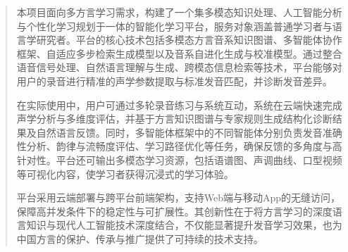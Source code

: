 

\begin{abstract}
本项目面向多方言学习需求，构建了一个集多模态知识处理、人工智能分析与个性化学习规划于一体的智能化学习平台，服务对象涵盖普通学习者与语言学研究者。平台的核心技术包括多模态方言音系知识图谱、多智能体协作框架、自适应多步检索生成模型以及音系自进化生成与校准模型。通过整合语音信号处理、自然语言理解与生成、跨模态信息检索等技术，平台能够对用户的录音进行精准的声学参数提取与标准发音匹配，并诊断发音差异。

在实际使用中，用户可通过多轮录音练习与系统互动，系统在云端快速完成声学分析与多维度评估，并基于方言知识图谱与专家规则生成结构化诊断结果及自然语言反馈。同时，多智能体框架中的不同智能体分别负责发音准确性分析、韵律与流畅度评估、学习路径优化等任务，确保反馈的多角度与高针对性。平台还可输出多模态学习资源，包括语谱图、声调曲线、口型视频等可视化内容，使学习者获得沉浸式的学习体验。

平台采用云端部署与跨平台前端架构，支持Web端与移动App的无缝访问，保障高并发条件下的稳定性与可扩展性。其创新性在于将方言学习的深度语言知识与现代人工智能技术深度结合，不仅能显著提升发音学习效果，也为中国方言的保护、传承与推广提供了可持续的技术支持。
\end{abstract}

